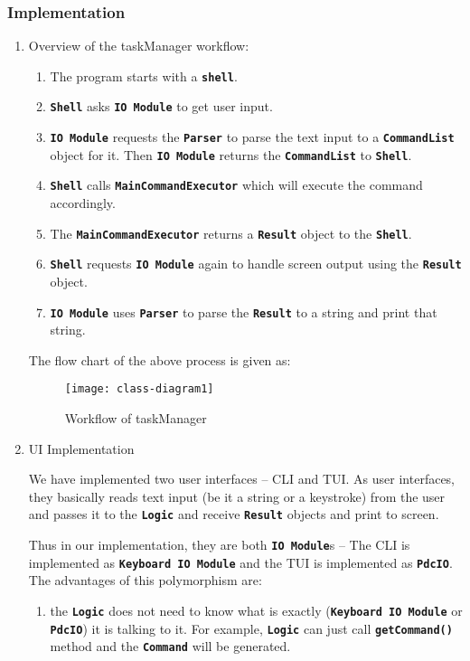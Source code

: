 \documentclass[12pt, a4paper]{article}
\newcommand{\cmdinline}[1]{{\bf \texttt{#1}}}
\begin{document}
\subsubsection{Implementation}
\begin{enumerate}
\item  Overview of the taskManager workflow:
\begin{enumerate}
\item The program starts with a \cmdinline{shell}.
\item \cmdinline{Shell} asks \cmdinline{IO Module} to get user input.
\item \cmdinline{IO Module} requests the \cmdinline{Parser} to parse the text input to a \cmdinline{CommandList} object for it. Then \cmdinline{IO Module} returns the \cmdinline{CommandList} to \cmdinline{Shell}.
\item \cmdinline{Shell} calls \cmdinline{MainCommandExecutor} which will execute the command accordingly.
\item The \cmdinline{MainCommandExecutor} returns a \cmdinline{Result} object to the \cmdinline{Shell}.
\item \cmdinline{Shell} requests \cmdinline{IO Module} again to handle screen output using the \cmdinline{Result} object.
\item \cmdinline{IO Module} uses \cmdinline{Parser} to parse the \cmdinline{Result} to a string and print that string.
\end{enumerate}

The flow chart of the above process is given as:
\begin{figure}[h]
  \centering
  \texttt{[image: class-diagram1]}
  \caption{Workflow of taskManager}
\end{figure}

\newpage
\item UI Implementation

We have implemented two user interfaces -- CLI and TUI.
As user interfaces, they basically reads text input (be it a string or a keystroke) from the user and passes it to the \cmdinline{Logic} and receive \cmdinline{Result} objects and print to screen. 

Thus in our implementation, they are both \cmdinline{IO Module}s  -- The CLI is implemented as \cmdinline{Keyboard IO Module} and the TUI is implemented as \cmdinline{PdcIO}. The advantages of this polymorphism are:
\begin{enumerate}
\item the \cmdinline{Logic} does not need to know what is exactly (\cmdinline{Keyboard IO Module} or \cmdinline{PdcIO}) it is talking to it. For example, \cmdinline{Logic} can just call \cmdinline{getCommand()} method and the \cmdinline{Command} will be generated.


\end{enumerate}
\end{enumerate}
\end{document}

